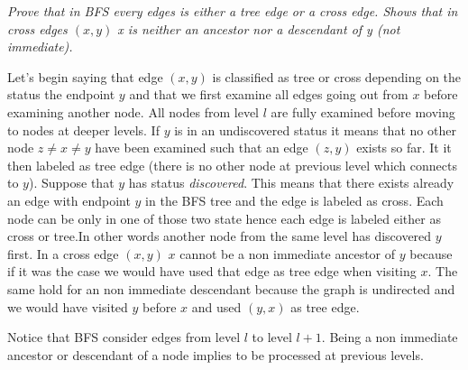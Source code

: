 \begin{problem}{\textit{Prove that in BFS every edges is either a tree edge or a cross edge. Shows that in cross edges $(x,y)$ x is neither an ancestor nor a descendant of y (not immediate).}}

\begin{solution}
Let's begin saying that edge $(x,y) $ is classified as tree or cross depending on the status the endpoint $y$ and that we first examine all edges going out from $x$ before examining another node. All nodes from level $l$ are fully examined before moving to nodes at deeper levels.
If $y$ is in an undiscovered status it means that no other node $z \neq x \neq y$ have been examined such that an edge $(z,y)$ exists so far. It it then labeled as tree edge (there is no other node at previous level which connects to $y$).
Suppose that $y$ has status \textit{discovered}. This means that there exists already an edge with endpoint $y$ in the BFS tree and the edge is labeled as cross. Each node can be only in one of those two state hence each edge is labeled either as cross or tree.In other words another node from the same level has discovered $y$ first. 
In a cross edge $(x,y)$ $x$ cannot be a non immediate ancestor of $y$ because if it was the case we would have used that edge as tree edge when visiting $x$.
The same hold for an non immediate descendant because the graph is undirected and we would have visited $y$ before $x$ and used $(y,x)$ as tree edge.

Notice that BFS consider edges from level $l$ to level $l+1$. Being a non immediate ancestor or descendant of a node implies to be processed at previous levels.


\end{solution}

\end{problem}

